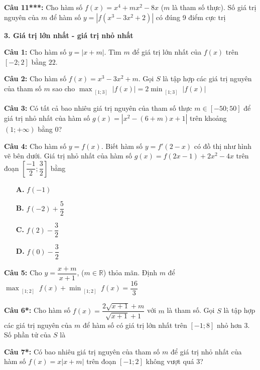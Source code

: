\documentclass[12pt, a4paper]{article}
\begin{document}
		\textbf{Câu 11***: } Cho hàm số $f(x)=x^4+mx^2-8x$ ($m$ là tham số thực). Số giá trị nguyên của $m$ để hàm số $y= \left| f \left( x^3-3x^2+2 \right) \right| $ có đúng 9 điểm cực trị
			

\textbf{3. Giá trị lớn nhất - giá trị nhỏ nhất}

\vspace{-0.2cm}

		\textbf{Câu 1: } Cho hàm số $y=|x+m|$. Tìm $m$ để giá trị lớn nhất của $f(x)$ trên $[-2;2]$ bằng $22$.
		
		\textbf{Câu 2: } Cho hàm số $f(x)=x^3-3x^2+m$. Gọi $S$ là tập hợp các giá trị nguyên của tham số $m$ sao cho $\displaystyle\max_{\substack{[1;3]}} \left|f(x)\right| = 2 \displaystyle\min_{\substack{[1;3]}} \left|f(x)\right|$
		
		\textbf{Câu 3: } Có tất cả bao nhiêu giá trị nguyên của tham số thực $m\in [-50;50]$ để giá trị nhỏ nhất của hàm số $g(x)=\left| x^2 -(6+m)x +1 \right|$ trên khoảng $(1; +\infty)$ bằng $0$?
		
		\textbf{Câu 4: } Cho hàm số $y=f(x)$. Biết hàm số $y=f'(2-x)$ có đồ thị như hình vẽ bên dưới. Giá trị nhỏ nhất của hàm số $g(x)=f(2x-1)+2x^2-4x$ trên đoạn $\left[\dfrac{-1}{2};\dfrac{3}{2} \right]$ bằng
			\begin{multicols}{4}
				\begin{enumerate}
					\item[\textbf{A.}] $f(-1)$
					\item[\textbf{B.}] $f(-2)+\dfrac{5}{2}$
					\item[\textbf{C.}] $f(2)-\dfrac{3}{2}$
					\item[\textbf{D.}] $f(0)-\dfrac{3}{2}$
				\end{enumerate}
			\end{multicols}
			
		\textbf{Câu 5: } Cho $y=\dfrac{x+m}{x+1}$, ($m \in \mathbb{R}$) thỏa mãn. Định $m$ để $\displaystyle\max_{\substack{[1;2]}} f(x) + \displaystyle\min_{\substack{[1;2]}} f(x) = \dfrac{16}{3}$
		
		\textbf{Câu 6*: } Cho hàm số $f(x)=\dfrac{2\sqrt{x+1}+m}{\sqrt{x+1}+1}$ với $m$ là tham số. Gọi $S$ là tập hợp các giá trị nguyên của $m$ để hàm số có giá trị lớn nhất trên $[-1;8]$ nhỏ hơn 3. Số phần tử của $S$ là
		
		\textbf{Câu 7*: } Có bao nhiêu giá trị nguyên của tham số $m$ để giá trị nhỏ nhất của hàm số $f(x)=x|x+m|$ trên đoạn $[-1;2]$ không vượt quá 3?
		
\end{document}
